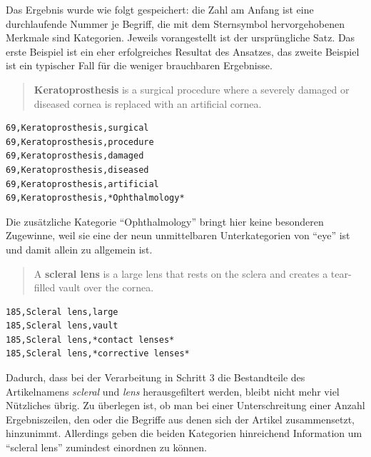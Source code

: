 \documentclass[pagesize,paper=A4,DIV=calc,fontsize=12pt,draft=false]{scrreprt}
\begin{document}
Das Ergebnis wurde wie folgt gespeichert: die Zahl am Anfang ist eine durchlaufende Nummer je Begriff, die mit dem Sternsymbol hervorgehobenen Merkmale sind Kategorien. 
Jeweils vorangestellt ist der ursprüngliche Satz. 
Das erste Beispiel ist ein eher erfolgreiches Resultat des Ansatzes, das zweite Beispiel ist ein typischer Fall für die weniger brauchbaren Ergebnisse. 

\begin{quote}
\textbf{Keratoprosthesis} is a surgical procedure where a severely damaged or diseased cornea is replaced with an artificial cornea.
\end{quote}

\lstset{
language=Bash
}

\begin{lstlisting}[caption={Beispiel für eine Ergebnisliste nach Filterung mit Wortartenerkennung. Das in Sternen eingefasste Wort ist die Kategorie.}]
69,Keratoprosthesis,surgical 
69,Keratoprosthesis,procedure
69,Keratoprosthesis,damaged 
69,Keratoprosthesis,diseased
69,Keratoprosthesis,artificial 
69,Keratoprosthesis,*Ophthalmology*
\end{lstlisting}

Die zusätzliche Kategorie \enquote{Ophthalmology} bringt hier keine besonderen Zugewinne, weil sie eine der neun unmittelbaren Unterkategorien von \enquote{eye} ist und damit allein zu allgemein ist.

\begin{quote}
A \textbf{scleral lens} is a large lens that rests on the sclera and creates a tear-filled vault over the cornea.
\end{quote}

\lstset{
language=Bash,
}

\begin{lstlisting}[caption={Beispiel für eine Ergebnisliste nach Filterung mit Wortartenerkennung. Die in Sternen eingefassten Wörter sind Kategorien.}]
185,Scleral lens,large 
185,Scleral lens,vault 
185,Scleral lens,*contact lenses* 
185,Scleral lens,*corrective lenses*
\end{lstlisting}

Dadurch, dass bei der Verarbeitung in Schritt 3 die Bestandteile des Artikelnamens \emph{scleral} und \emph{lens} herausgefiltert werden, bleibt nicht mehr viel Nützliches übrig. 
Zu überlegen ist, ob man bei einer Unterschreitung einer Anzahl Ergebniszeilen, den oder die Begriffe aus denen sich der Artikel zusammensetzt, hinzunimmt. 
Allerdings geben die beiden Kategorien hinreichend Information um \enquote{scleral lens} zumindest einordnen zu können. 
\end{document}
